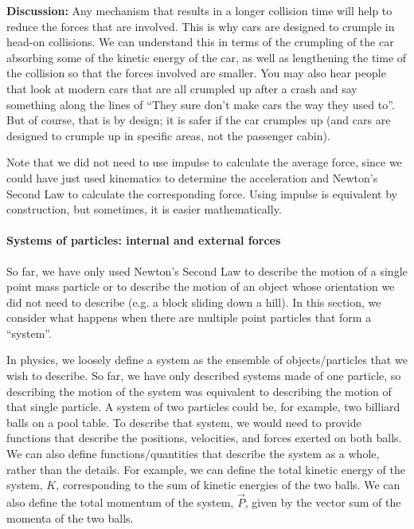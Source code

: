 \begin{framed}
\begin{framed}
\textbf{Discussion:} Any mechanism that results in a longer collision time will help to reduce the forces that are involved. This is why cars are designed to crumple in head-on collisions. We can understand this in terms of the crumpling of the car absorbing some of the kinetic energy of the car, as well as lengthening the time of the collision so that the forces involved are smaller. You may also hear people that look at modern cars that are all crumpled up after a crash and say something along the lines of ``They sure don't make cars the way they used to''. But of course, that is by design; it is safer if the car crumples up (and cars are designed to crumple up in specific areas, not the passenger cabin).

Note that we did not need to use impulse to calculate the average force, since we could have just used kinematics to determine the acceleration and Newton's Second Law to calculate the corresponding force. Using impulse is equivalent by construction, but sometimes, it is easier mathematically.
\end{framed}
\end{framed}

\paragraph{Systems of particles: internal and external forces}

So far, we have only used Newton's Second Law to describe the motion of a single point mass particle or to describe the motion of an object whose orientation we did not need to describe (e.g. a block sliding down a hill). In this section, we consider what happens when there are multiple point particles that form a ``system''.

In physics, we loosely define a system as the ensemble of objects/particles that we wish to describe. So far, we have only described systems made of one particle, so describing the motion of the system was equivalent to describing the motion of that single particle. A  system of two particles could be, for example, two billiard balls on a pool table. To describe that system, we would need to provide functions that describe the positions, velocities, and forces exerted on both balls. We can also define functions/quantities that describe the system as a whole, rather than the details. For example, we can define the total kinetic energy of the system, $K$, corresponding to the sum of kinetic energies of the two balls. We can also define the total momentum of the system, $\vec P$, given by the vector sum of the momenta of the two balls.

